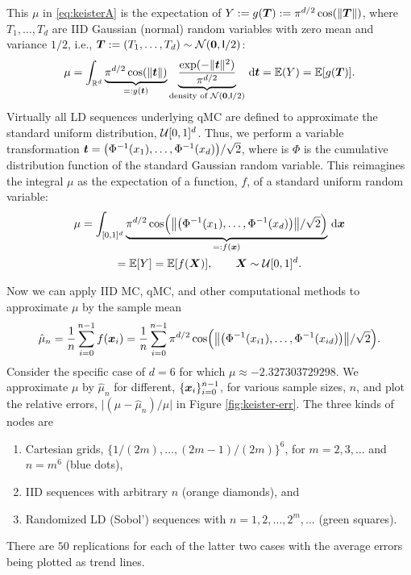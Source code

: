 \documentclass{svproc}
\begin{document}
This $\mu$ in \eqref{eq:keisterA} is the expectation of $Y := g({\boldsymbol{T}}) := \pi^{d/2} \cos(\lVert {\boldsymbol{T}} \rVert)$, where $T_1, \ldots, T_d$ are IID Gaussian (normal) random variables with zero mean and variance $1/2$, i.e., ${\boldsymbol{T}} :=(T_1, \ldots, T_d) \sim {\mathcal{N}}({\boldsymbol{0}},\mathsf{I}/2)$:
\begin{equation}\label{eq:keisterB}
	\mu = \int_{\mathbb{R}^d} \underbrace{\pi^{d/2} \cos(\lVert {\boldsymbol{t}} \rVert)}_{=:g({\boldsymbol{t}})}  \underbrace{\frac{\exp(-\lVert {\boldsymbol{t}} \rVert^2)}{\pi^{d/2}}}_{\text{density of } {\mathcal{N}}({\boldsymbol{0}},\mathsf{I}/2)} \, {\mathrm{d}} {\boldsymbol{t}} = {\mathbb{E}}(Y) = {\mathbb{E}}[g({\boldsymbol{T}})].
\end{equation}
Virtually all LD sequences underlying qMC are defined to approximate the standard uniform distribution, ${\mathcal{U}}[0,1]^d$.  Thus, we perform a variable transformation ${\boldsymbol{t}} = \bigl (\Phi^{-1}(x_1), \ldots, \Phi^{-1}(x_d) \bigr )/\sqrt{2}$,
where is $\Phi$ is the cumulative distribution function of the standard Gaussian random variable.  This reimagines the integral $\mu$ as the expectation of a function, $f$, of a standard uniform random variable:
\begin{multline}\label{eq:keisterC}
	\mu = \int_{[0,1]^d} \underbrace{\pi^{d/2} \cos\Bigl (\bigl \lVert \bigl( \Phi^{-1}(x_1), \ldots, \Phi^{-1}(x_d)\bigr) \bigr\rVert/\sqrt{2}  \Bigr)}_{=:f({\boldsymbol{x}})} \, {\mathrm{d}} {\boldsymbol{x}} \\
	= {\mathbb{E}}[Y]
	= {\mathbb{E}}[f({\boldsymbol{X}})], \qquad {\boldsymbol{X}} \sim {\mathcal{U}}[0,1]^d.
\end{multline}

Now we can apply IID MC, qMC, and other computational methods to approximate $\mu$ by the sample mean
\begin{equation} \label{eq:sample_mean_Keister}
	\hat{\mu}_n = \frac 1n \sum_{i=0}^{n-1} f ({\boldsymbol{x}}_i) = \frac 1n \sum_{i=0}^{n-1} \pi^{d/2} \cos\Bigl (\bigl \lVert \bigl( \Phi^{-1}(x_{i1}), \ldots, \Phi^{-1}(x_{id})\bigr) \bigr\rVert/\sqrt{2}  \Bigr).
\end{equation}
Consider the specific case of $d=6$ for which $\mu \approx -2.327303729298$.  We approximate $\mu$ by $\hat{\mu}_n$ for different, $\{{\boldsymbol{x}}_i\}_{i=0}^{n-1}$, for various sample sizes, $n$, and plot the relative errors, $\lvert (\mu - 	\hat{\mu}_n)/\mu\rvert$ in Figure \ref{fig:keister-err}. The three kinds of nodes are
\begin{enumerate}
	\renewcommand{\labelenumi}{\roman{enumi}.}
	\item Cartesian grids, $\{1/(2m), \ldots, (2m-1)/(2m) \}^6$, for $m = 2, 3, \ldots$ and $n = m^6$ (blue dots),
	\item IID sequences with arbitrary $n$ (orange diamonds), and
	\item Randomized LD (Sobol') sequences with $n = 1, 2, \ldots, 2^m, \ldots $ (green squares).
\end{enumerate}
There are $50$ replications for each of the latter two cases with the average errors being plotted as trend lines.
\end{document}
